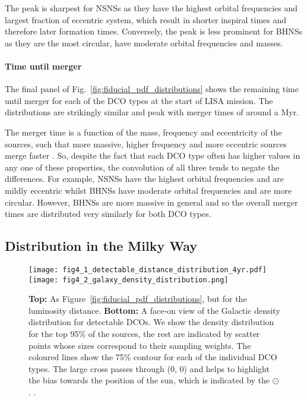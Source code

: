 The peak is sharpest for NSNSs as they have the highest orbital frequencies and largest fraction of eccentric system, which result in shorter inspiral times and therefore later formation times. Conversely, the peak is less prominent for BHNSs as they are the most circular, have moderate orbital frequencies and masses.

\paragraph{Time until merger} The final panel of Fig.~\ref{fig:fiducial_pdf_distributions} shows the remaining time until merger for each of the DCO types at the start of LISA mission. The distributions are strikingly similar and peak with merger times of around a Myr.

The merger time is a function of the mass, frequency and eccentricity of the sources, such that more massive, higher frequency and more eccentric sources merge faster \citep[][Eq.~5.14]{Peters+1964}. So, despite the fact that each DCO type often has higher values in any one of these properties, the convolution of all three tends to negate the differences. For example, NSNSs have the highest orbital frequencies and are mildly eccentric whilst BHNSs have moderate orbital frequencies and are more circular. However, BHNSs are more massive in general and so the overall merger times are distributed very similarly for both DCO types.

\subsection{Distribution in the Milky Way}\label{sec:mw_detectable_distribution}

\begin{figure}[tb]
    \centering
    \texttt{[image: fig4\_1\_detectable\_distance\_distribution\_4yr.pdf]}
    \texttt{[image: fig4\_2\_galaxy\_density\_distribution.png]}
    \caption{\textbf{Top:} As Figure~\ref{fig:fiducial_pdf_distributions}, but for the luminosity distance. \textbf{Bottom:} A face-on view of the Galactic density distribution for detectable DCOs. We show the density distribution for the top 95\% of the sources, the rest are indicated by scatter points whose sizes correspond to their sampling weights. The coloured lines show the 75\% contour for each of the individual DCO types. The large cross passes through (0, 0) and helps to highlight the bias towards the position of the sun, which is indicated by the $\odot$. \href{https://github.com/TomWagg/detecting-DCOs-in-LISA/blob/main/paper/figures/fig4_1_detectable_distance_distribution_4yr.pdf}{\faFileImage} \href{https://github.com/TomWagg/detecting-DCOs-in-LISA/blob/main/paper/figure_notebooks/fiducial.ipynb}{\faBook} \href{https://github.com/TomWagg/detecting-DCOs-in-LISA/blob/main/paper/figures/fig4_2_galaxy_density_distribution.png}{\faFileImage} \href{https://github.com/TomWagg/detecting-DCOs-in-LISA/blob/main/paper/figure_notebooks/galaxy_creation_station.ipynb}{\faBook}.}
    \label{fig:detectable_distance_dist}
\end{figure}

